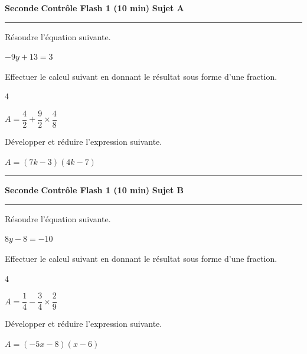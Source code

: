 \documentclass[a4paper,11pt,fleqn]{article}
\newcounter{ExoMA}
\begin{document}
{
  \normalsize
  \textbf{Seconde} \hfill \textbf{Contrôle Flash 1 (10 min)} \hfill \textbf{Sujet A}
}
\hrule
\vfill



\begin{EXO}{}{}
Résoudre l'équation suivante.


 $-9y+13=3$
\end{EXO}

\begin{EXO}{}{}
Effectuer le calcul suivant en donnant le résultat sous forme d'une fraction.

\begin{multicols}{4}
 \begin{minipage}[t]{\linewidth} $A = \dfrac{4}{2} + \dfrac{9}{2} \times \dfrac{4}{8}$  \end{minipage}
\end{multicols}
\end{EXO}

\begin{EXO}{}{}
Développer et réduire l'expression suivante.


 $A = (7k-3)(4k-7)$
\end{EXO}


\vfill

\hrule

\vfill
\setcounter{ExoMA}{0}
{
  \normalsize
  \textbf{Seconde} \hfill \textbf{Contrôle Flash 1 (10 min)} \hfill \textbf{Sujet B}
}
\hrule
\vfill


\begin{EXO}{}{}
Résoudre l'équation suivante.


 $8y-8=-10$
\end{EXO}

\begin{EXO}{}{}
Effectuer le calcul suivant en donnant le résultat sous forme d'une fraction.

\begin{multicols}{4}
 \begin{minipage}[t]{\linewidth} $A = \dfrac{1}{4} - \dfrac{3}{4} \times \dfrac{2}{9}$ \end{minipage}
\end{multicols}
\end{EXO}

\begin{EXO}{}{}
Développer et réduire l'expression suivante.


 $A = (-5x-8)(x-6)$
\end{EXO}
\end{document}
